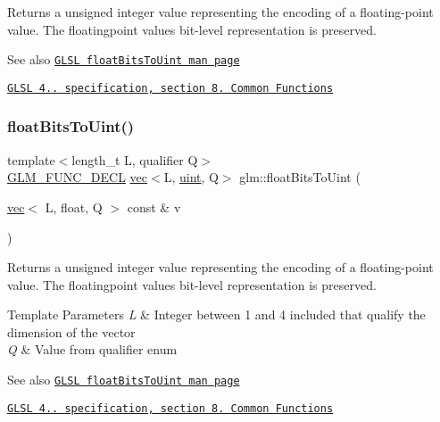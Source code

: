 Returns a unsigned integer value representing the encoding of a floating-\/point value. The floatingpoint value\textquotesingle{}s bit-\/level representation is preserved.

\begin{DoxySeeAlso}{See also}
\href{http://www.opengl.org/sdk/docs/manglsl/xhtml/floatBitsToUint.xml}{\tt G\+L\+SL float\+Bits\+To\+Uint man page} 

\href{http://www.opengl.org/registry/doc/GLSLangSpec.4.20.8.pdf}{\tt G\+L\+SL 4.. specification, section 8. Common Functions} 
\end{DoxySeeAlso}
\mbox{\label{group__core__func__common_ga49418ba4c8a60fbbb5d57b705f3e26db}} 
\subsubsection{\texorpdfstring{float\+Bits\+To\+Uint()}{floatBitsToUint()}\hspace{0.1cm}{\footnotesize\ttfamily [2/2]}}
{\footnotesize\ttfamily template$<$length\+\_\+t L, qualifier Q$>$ \\
\hyperlink{setup_8hpp_ab2d052de21a70539923e9bcbf6e83a51}{G\+L\+M\+\_\+\+F\+U\+N\+C\+\_\+\+D\+E\+CL} \hyperlink{structglm_1_1vec}{vec}$<$L, \hyperlink{group__core__precision_ga4fd29415871152bfb5abd588334147c8}{uint}, Q$>$ glm\+::float\+Bits\+To\+Uint (\begin{DoxyParamCaption}\item[{\hyperlink{structglm_1_1vec}{vec}$<$ L, float, Q $>$ const \&}]{v }\end{DoxyParamCaption})}

Returns a unsigned integer value representing the encoding of a floating-\/point value. The floatingpoint value\textquotesingle{}s bit-\/level representation is preserved.


\begin{DoxyTemplParams}{Template Parameters}
{\em L} & Integer between 1 and 4 included that qualify the dimension of the vector \\
\hline
{\em Q} & Value from qualifier enum\\
\hline
\end{DoxyTemplParams}
\begin{DoxySeeAlso}{See also}
\href{http://www.opengl.org/sdk/docs/manglsl/xhtml/floatBitsToUint.xml}{\tt G\+L\+SL float\+Bits\+To\+Uint man page} 

\href{http://www.opengl.org/registry/doc/GLSLangSpec.4.20.8.pdf}{\tt G\+L\+SL 4.. specification, section 8. Common Functions} 
\end{DoxySeeAlso}
\mbox{\label{group__core__func__common_gaa9d0742639e85b29c7c5de11cfd6840d}} 
